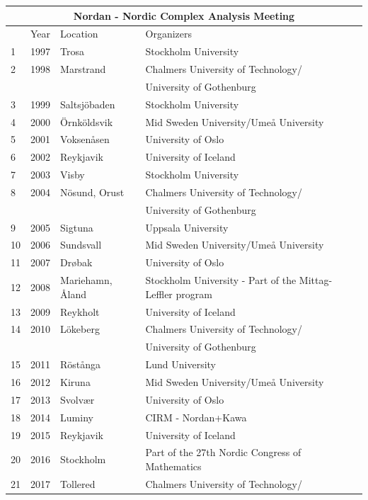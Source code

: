 \documentclass[12pt,openany]{report}      %
\begin{document}
\newpage

\begin{tabular}{llll}
    \toprule
    \multicolumn{4}{c}{Nordan - Nordic Complex Analysis Meeting}\\
    \midrule
     & Year & Location & Organizers \\
     \midrule
    1 & 1997 & Trosa & Stockholm University  \\
    2 & 1998 & Marstrand & Chalmers University of Technology/\\
      &      &               & University of Gothenburg \\
    3 & 1999 & Saltsjöbaden & Stockholm University  \\
    4 & 2000 & Örnköldsvik & Mid Sweden University/Umeå University\\
    5 & 2001 & Voksenåsen & University of Oslo \\
    6 & 2002 & Reykjavik & University of Iceland \\
    7 & 2003 & Visby & Stockholm University\\
    8 & 2004 & Nösund, Orust & Chalmers University of Technology/\\
       &      &               & University of Gothenburg \\
    9 & 2005 & Sigtuna & Uppsala University \\
    10 & 2006 & Sundsvall & Mid Sweden University/Umeå University \\
    11 & 2007 & Drøbak & University of Oslo\\
    12 & 2008 & Mariehamn, Åland & Stockholm University - Part of the Mittag-Leffler program\\
    13 & 2009 & 
    Reykholt & University of Iceland\\
    14 & 2010 & Lökeberg & Chalmers University of Technology/\\
       &      &               & University of Gothenburg\\
    15 & 2011 & Röstånga & Lund University\\
    16 & 2012 & Kiruna & Mid Sweden University/Umeå University\\
    17 & 2013 & Svolvær & University of Oslo\\
    18 & 2014 & Luminy & CIRM - Nordan+Kawa\\
    19 & 2015 & Reykjavik & University of Iceland\\
    20 & 2016 & Stockholm & Part of the 27th Nordic Congress of Mathematics\\
    21 & 2017 & Tollered & Chalmers University of Technology/\\

\end{tabular}
\end{document}
